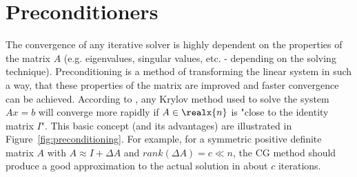 \section{Preconditioners}
\label{sec:preconditioners}
The convergence of any iterative solver is highly dependent on the properties of the matrix $A$ (e.g. eigenvalues, singular values, etc. - depending on the solving technique). Preconditioning is a method of transforming the linear system in such a way, that these properties of the matrix are improved and faster convergence can be achieved. According to \cite{golub_matrix_2013}, any Krylov method used to solve the system $Ax=b$ will converge more rapidly if $A \in \realx{n}$ is "close to the identity matrix $I$". This basic concept (and its advantages) are illustrated in Figure~\hyperref[fig:preconditioning]{\ref{fig:preconditioning}}. For example, for a symmetric positive definite matrix $A$ with $A \approx I +\Delta A$ and $rank(\Delta A)=c \ll n$, the CG method should produce a good approximation to the actual solution in about $c$ iterations.

